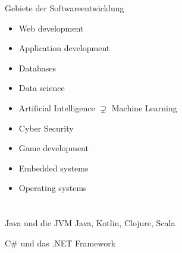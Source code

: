 \begin{frame}{Gebiete der Softwareentwicklung}
    \begin{itemize}
        \item Web development
        \item Application development
        \item Databases
        \item Data science
        \item Artificial Intelligence $\supsetneq$ Machine Learning
        \item Cyber Security
        \item Game development
        \item Embedded systems
        \item Operating systems
    \end{itemize}

\end{frame}

\section{}


\begin{frame}{Java und die JVM}
    Java, Kotlin, Clojure, Scala

\end{frame}

\begin{frame}{C\# und das .NET Framework}

\end{frame}






